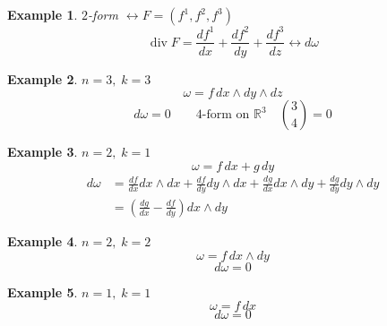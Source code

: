 \documentclass[12pt]{article}
\def\RR{\mathbb{R}}
\DeclareMathOperator{\dive}{div}
\newtheorem{example}{Example}[section]
\begin{document}
\begin{example} $2$-form $\leftrightarrow F=(f^1, f^2, f^3)$
\[\dive F = \frac{df^1}{dx} + \frac{df^2}{dy} + \frac{df^3}{dz} \leftrightarrow d\omega\]
\end{example}

\begin{example}
$n=3, \; k=3$
\[\omega = f \,dx\wedge dy \wedge dz\] 
\[d\omega = 0 \qquad \text{4-form on }\RR^3 \quad {3 \choose 4}=0\]
\end{example}

\begin{example}
$n=2, \;k=1$
\[\omega = f\, dx + g\,dy\]
\begin{align*}
d\omega &= \frac{df}{dx}dx\wedge dx + \frac{df}{dy}dy\wedge dx + \frac{dg}{dx}dx\wedge dy + \frac{dg}{dy}dy\wedge dy\\
&= \left(\frac{dg}{dx} -  \frac{df}{dy}\right)dx \wedge dy
\end{align*}
\end{example}

\begin{example}
$n=2, \;k=2$
\[\omega = f\, dx\wedge dy\]
\[d\omega =0\]
\end{example}
\begin{example}
$n=1, \;k=1$
\[\omega = f\, dx\]
\[d\omega =0\]
\end{example}
\end{document}
